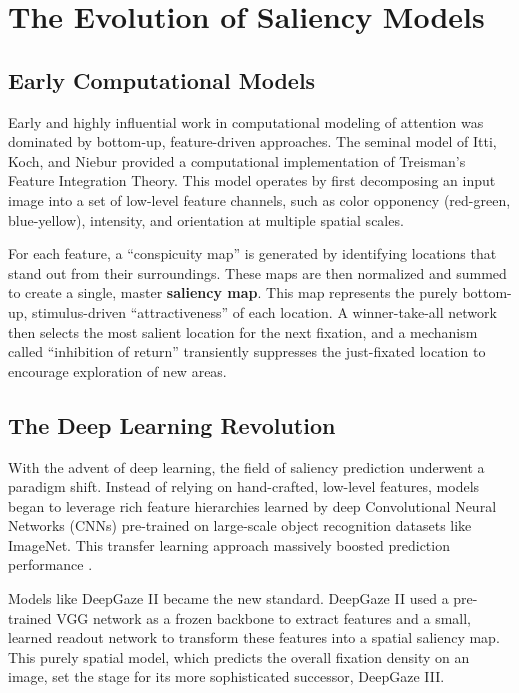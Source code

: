 \section{The Evolution of Saliency Models}
\label{sec:sota_evolution}

\subsection{Early Computational Models}
Early and highly influential work in computational modeling of attention was dominated by bottom-up, feature-driven approaches. The seminal model of Itti, Koch, and Niebur \cite{itti1998model} provided a computational implementation of Treisman's Feature Integration Theory. This model operates by first decomposing an input image into a set of low-level feature channels, such as color opponency (red-green, blue-yellow), intensity, and orientation at multiple spatial scales. 

For each feature, a \enquote{conspicuity map} is generated by identifying locations that stand out from their surroundings. These maps are then normalized and summed to create a single, master \textbf{saliency map}. This map represents the purely bottom-up, stimulus-driven \enquote{attractiveness} of each location. A winner-take-all network then selects the most salient location for the next fixation, and a mechanism called \enquote{inhibition of return} transiently suppresses the just-fixated location to encourage exploration of new areas.

\subsection{The Deep Learning Revolution}
With the advent of deep learning, the field of saliency prediction underwent a paradigm shift. Instead of relying on hand-crafted, low-level features, models began to leverage rich feature hierarchies learned by deep Convolutional Neural Networks (CNNs) pre-trained on large-scale object recognition datasets like ImageNet. This transfer learning approach massively boosted prediction performance \cite{kummerer2017understanding}.

Models like DeepGaze II \cite{kummerer2017understanding} became the new standard. DeepGaze II used a pre-trained VGG network as a frozen backbone to extract features and a small, learned readout network to transform these features into a spatial saliency map. This purely spatial model, which predicts the overall fixation density on an image, set the stage for its more sophisticated successor, DeepGaze III.

